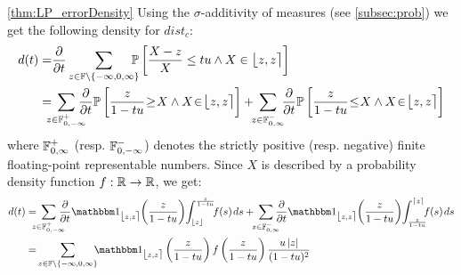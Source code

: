 \begin{myproof}{\cref{thm:LP_errorDensity}}
Using the $\sigma$-additivity of measures (see \cref{subsec:prob}) we get the following density for $dist_c$:
\newcommand{\ssin}{\hspace{-2pt}\in\hspace{-2pt}}
\begin{align*}
d(t)=&\dt\sum_{z\in\F\setminus\{-\infty,0,\infty\}}\hspace{-8pt}\Pro{\frac{X-z}{X}\leq t\uro\wedge X\in \fintvl[z]}\\
=&\hspace{-6pt} \sum_{z\in\F^+_{0,-\infty}}\hspace{-8pt}\dt\Pro{\frac{z}{1-t\uro}\hspace{-2pt}\geq\hspace{-2pt} X\wedge X\ssin\fintvl[z]}+\hspace{-4pt}
\sum_{z\in\F^-_{0,\infty}}\hspace{-4pt}\dt\Pro{\frac{z}{1-t\uro}\hspace{-2pt}\leq\hspace{-2pt} X \wedge X\ssin \fintvl[z]}
\end{align*}
where $\mathbb{F}^+_{0,\infty}$ (resp. $\mathbb{F}^-_{0,-\infty}$) denotes the strictly positive (resp. negative) finite floating-point representable numbers.
Since $X$ is described by a probability density function $f:\mathbb{R}\to\mathbb{R}$, we get:
\begin{align}
d(t)
=&\hspace{-6pt}\sum_{z\in\F^+_{0,-\infty}}\hspace{-8pt}\dt\one_{\fintvl[z]}\hspace{-2pt} \left(\frac{z}{1-t\uro}\right)\hspace{-2pt} \int^{\frac{z}{1-t\uro}}_{\floor{z}}\hspace{-4pt}f(s)\hspace{1pt}ds\nonumber+
\hspace{-4pt}\sum_{z\in\F^-_{0,\infty}}\hspace{-6pt} \dt\one_{\fintvl[z]}\hspace{-2pt}\left(\frac{z}{1-t\uro}\right)\hspace{-2pt} \int^{\ceil{z}}_{\frac{z}{1-t\uro}}\hspace{-5pt} f(s)\hspace{1pt}ds\nonumber 
\\
=&\sum_{z\in\F\setminus\{-\infty,0,\infty\}}\hspace{-5pt}\one_{\fintvl[z]}\left(\frac{z}{1-t\uro}\right) f\left(\frac{z}{1-t\uro}\right) \frac{\uro\absv{z}}{(1-t\uro)^2}\nonumber
\end{align}
\end{myproof}

